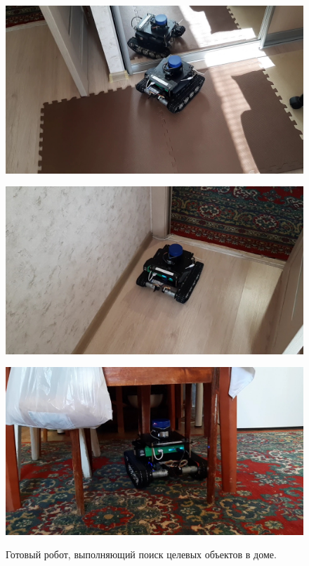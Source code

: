 \documentclass[12pt,a4paper]{scrartcl}
\begin{document}
			\begin{figure}[ht]
  				\begin{minipage}[b][][b]{0.32\linewidth}\centering
  					  \includegraphics[width=1\linewidth]{robot-complete1.jpg} \\
  				\end{minipage}
  				\hfill
  				\begin{minipage}[b][][b]{0.32\linewidth}\centering
 					   \includegraphics[width=1\linewidth]{robot-complete2.jpg} \\
 				 \end{minipage}
 				 \hfill
				  \begin{minipage}[b][][b]{0.32\linewidth}\centering
 					   \includegraphics[width=1\linewidth]{robot-complete3.jpg} \\
  				 \end{minipage}
 				 \caption{Готовый робот, выполняющий поиск целевых объектов в доме.}
				  \label{fig:robot-complete}
			\end{figure}
	
\end{document}
